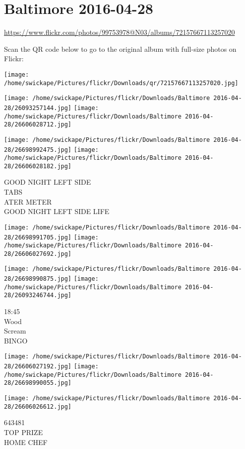 \documentclass[10pt,letterpaper]{article}
\title{}
\author{}
\date{}
\begin{document}
\section*{Baltimore 2016-04-28}

\url{https://www.flickr.com/photos/99753978@N03/albums/72157667113257020}

Scan the QR code below to go to the original album with full-size photos on Flickr:

\texttt{[image: /home/swickape/Pictures/flickr/Downloads/qr/72157667113257020.jpg]}
\pagebreak

\texttt{[image: /home/swickape/Pictures/flickr/Downloads/Baltimore 2016-04-28/26093257144.jpg]}
\texttt{[image: /home/swickape/Pictures/flickr/Downloads/Baltimore 2016-04-28/26606028712.jpg]}

\texttt{[image: /home/swickape/Pictures/flickr/Downloads/Baltimore 2016-04-28/26698992475.jpg]}
\texttt{[image: /home/swickape/Pictures/flickr/Downloads/Baltimore 2016-04-28/26606028182.jpg]}

GOOD NIGHT LEFT SIDE\\
TABS\\
ATER METER\\
GOOD NIGHT LEFT SIDE LIFE
\pagebreak

\texttt{[image: /home/swickape/Pictures/flickr/Downloads/Baltimore 2016-04-28/26698991705.jpg]}
\texttt{[image: /home/swickape/Pictures/flickr/Downloads/Baltimore 2016-04-28/26606027692.jpg]}

\texttt{[image: /home/swickape/Pictures/flickr/Downloads/Baltimore 2016-04-28/26698990875.jpg]}
\texttt{[image: /home/swickape/Pictures/flickr/Downloads/Baltimore 2016-04-28/26093246744.jpg]}

18:45\\
Wood\\
Scream\\
BINGO
\pagebreak

\texttt{[image: /home/swickape/Pictures/flickr/Downloads/Baltimore 2016-04-28/26606027192.jpg]}
\texttt{[image: /home/swickape/Pictures/flickr/Downloads/Baltimore 2016-04-28/26698990055.jpg]}

\texttt{[image: /home/swickape/Pictures/flickr/Downloads/Baltimore 2016-04-28/26606026612.jpg]}

643481\\
TOP PRIZE\\
HOME CHEF
\pagebreak
\end{document}
